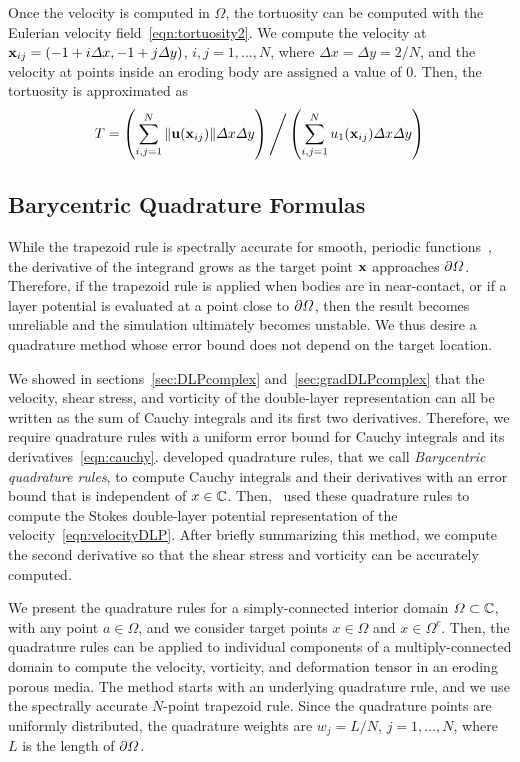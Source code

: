 \documentclass{jfm}
\begin{document}
Once the velocity is computed in $\Omega$, the tortuosity can be
computed with the Eulerian velocity field~\eqref{eqn:tortuosity2}.  We
compute the velocity at ${\mathbf{x}}_{ij} = (-1 + i\varDelta x, -1 + j\varDelta y)$,
$i,j=1,\ldots,N$, where $\Delta x = \Delta y = 2/N$, and the velocity at
points inside an eroding body are assigned a value of 0.  Then, the
tortuosity is approximated as
\begin{align}
  T = \left(\sum_{i,j=1}^N \|{\mathbf{u}}({\mathbf{x}}_{ij})\|\varDelta x \varDelta y \right) 
      \Bigg/ 
      \left(\sum_{i,j=1}^N u_1({\mathbf{x}}_{ij}) \varDelta x \varDelta y \right)
\end{align}

\subsection{Barycentric Quadrature Formulas}
\label{sec:bary}
While the trapezoid rule is spectrally accurate for smooth, periodic
functions~\citep{tre-wei2014}, the derivative of the integrand grows as
the target point ${\mathbf{x}}$ approaches ${\partial}\varOmega$.  Therefore, if the
trapezoid rule is applied when bodies are in near-contact, or if a layer
potential is evaluated at a point close to ${\partial}\varOmega$, then the result
becomes unreliable and the simulation ultimately becomes unstable.  We
thus desire a quadrature method whose error bound does not depend on the
target location.

We showed in sections~\ref{sec:DLPcomplex} and~\ref{sec:gradDLPcomplex}
that the velocity, shear stress, and vorticity of the double-layer
representation can all be written as the sum of Cauchy integrals and its
first two derivatives.  Therefore, we require quadrature rules with a
uniform error bound for Cauchy integrals and its
derivatives~\eqref{eqn:cauchy}. \citet{ioa-pap-per1991} developed
quadrature rules, that we call {\em Barycentric quadrature rules}, to
compute Cauchy integrals and their derivatives with an error bound that
is independent of $x \in {\mathbb{C}}$.  Then,~\citet{bar-wu-vee2015} used these
quadrature rules to compute the Stokes double-layer potential
representation of the velocity~\eqref{eqn:velocityDLP}. After briefly
summarizing this method, we compute the second derivative so that the
shear stress and vorticity can be accurately computed.

We present the quadrature rules for a simply-connected interior domain
$\varOmega \subset {\mathbb{C}}$, with any point $a \in \Omega$, and we consider
target points $x \in \Omega$ and $x \in \Omega^c$. Then, the quadrature
rules can be applied to individual components of a multiply-connected
domain to compute the velocity, vorticity, and deformation tensor in an
eroding porous media.  The method starts with an underlying quadrature
rule, and we use the spectrally accurate $N$-point trapezoid rule.
Since the quadrature points are uniformly distributed, the quadrature
weights are $w_j = L/N$, $j=1,\ldots,N$, where $L$ is the length of
${\partial}\varOmega$.
\end{document}
